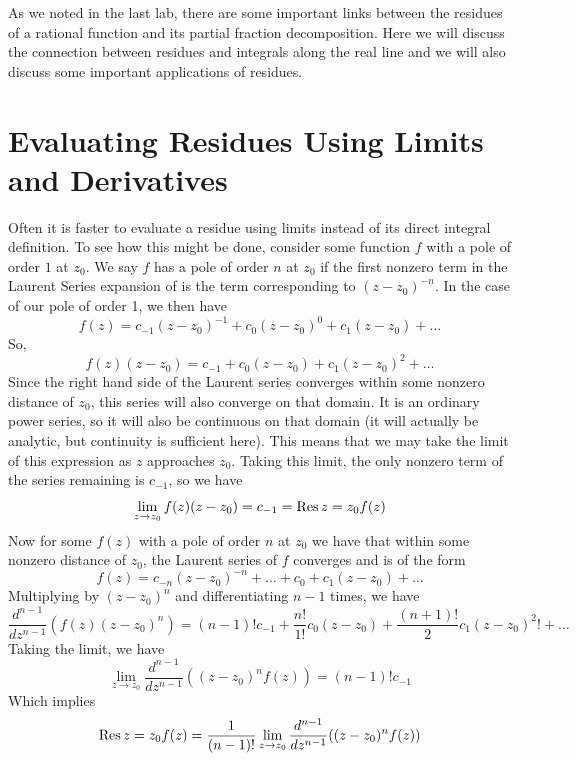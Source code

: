 

As we noted in the last lab, there are some important links between the residues of a rational function and its partial fraction decomposition.
Here we will discuss the connection between residues and integrals along the real line and we will also discuss some important applications of residues.

\section*{Evaluating Residues Using Limits and Derivatives}
Often it is faster to evaluate a residue using limits instead of its direct integral definition.
To see how this might be done, consider some function $f$ with a pole of order $1$ at $z_0$.
We say $f$ has a pole of order $n$ at $z_0$ if the first nonzero term in the Laurent Series expansion of is the term corresponding to $(z-z_0)^{-n}$. In the case of our pole of order 1, we then have
$$f(z)=c_{-1}(z-z_0)^{-1}+c_0 (z-z_0)^{0} +c_1 (z-z_0) + \dots$$
So,
$$f(z)(z-z_0)=c_{-1}+c_0 (z-z_0) + c_1 (z-z_0)^2 + \dots$$
Since the right hand side of the Laurent series converges within some nonzero distance of $z_0$, this series will also converge on that domain.
It is an ordinary power series, so it will also be continuous on that domain (it will actually be analytic, but continuity is sufficient here).
This means that we may take the limit of this expression as $z$ approaches $z_0$.
Taking this limit, the only nonzero term of the series remaining is $c_{-1}$, so we have
\begin{equation*}
\lim_{z\to z_0} f(z)(z-z_0) = c_{-1} = \operatorname{Res}{z=z_0} f(z)
\end{equation*}
Now for some $f(z)$ with a pole of order $n$ at $z_0$ we have that within some nonzero distance of $z_0$, the Laurent series of $f$ converges and is of the form
$$f(z)=c_{-n}(z-z_0)^{-n}+\dots+c_0+c_1(z-z_0)+\dots$$
Multiplying by $(z-z_0)^{n}$ and differentiating $n-1$ times, we have
$$\frac{d^{n-1}}{dz^{n-1}}(f(z)(z-z_0)^{n})=(n-1)! c_{-1} + \frac{n!}{1!} c_0 (z-z_0) + \frac{(n+1)!}{2} c_1 (z-z_0)^2!+\dots$$
Taking the limit, we have
\begin{equation*}
\lim_{z\to z_0}\frac{d^{n-1}}{dz^{n-1}}((z-z_0)^n f(z)) = (n-1)! c_{-1}
\end{equation*}
Which implies
\begin{equation*}
\operatorname{Res}{z=z_0}f(z)=\frac{1}{(n-1)!}\lim_{z\to z_0}\frac{d^{n-1}}{dz^{n-1}}((z-z_0)^n f(z))
\end{equation*}	
